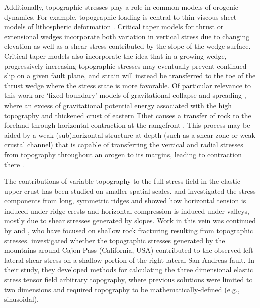 \documentclass[twocolumn,jgrga]{AGUTeX}
\begin{document}
\begin{article}
Additionally, topographic stresses play a role in common models of
orogenic dynamics. For example, topographic loading is central to thin
viscous sheet models of lithospheric deformation \citep[e.g.,][]{birdpiper80,
flesch2010gpe}. Critical taper models for thrust or extensional
wedges \citep[e.g.,][]{dahlen1990, xiao1991} incorporate both variation in
vertical stress due to changing elevation as well as a shear stress
contributed by the slope of the wedge surface. Critical taper models
also incorporate the idea that in a growing wedge, progressively
increasing topographic stresses may eventually prevent continued slip on
a given fault plane, and strain will instead be transferred to the toe
of the thrust wedge where the stress state is more favorable. Of
particular relevance to this work are `fixed boundary' models of
gravitational collapse and spreading \citep{rey2001}, where an excess of
gravitational potential energy associated with the high topography and
thickened crust of eastern Tibet causes a transfer of rock to the
foreland through horizontal contraction at the rangefront \citep[e.g.,][]
{dewey1988, liuyang2003, copleymckenzie2007}. This process may be
aided by a weak (sub)horizontal structure at depth (such as a shear zone
or weak crustal channel) that is capable of transferring the vertical
and radial stresses from topography throughout an orogen to its margins,
leading to contraction there \citep[e.g.,][]{clark2005, burchfiel2008,
fleschbendick2012}.

The contributions of variable topography to the full stress field in the
elastic upper crust has been studied on smaller spatial scales. 
\citet{mctiguemei1981} and
\citet{savageswolfs1986} investigated the stress components from long,
symmetric ridges and showed how horizontal tension is induced under
ridge crests and horizontal compression is induced under valleys, mostly
due to shear stresses generated by slopes. Work in this vein was
continued by \citet{millerdunne1996} and \citet{martel2006}, who have 
focused on shallow rock fracturing
resulting from topographic stresses. \citet{liuzoback1992} investigated 
whether the topographic stresses
generated by the mountains around Cajon Pass (California, USA)
contributed to the observed left-lateral shear stress on a shallow
portion of the right-lateral San Andreas fault. In their study, they
developed methods for calculating the three dimensional elastic stress
tensor field arbitrary topography, where previous solutions were limited
to two dimensions and required topography to be mathematically-defined
(e.g., sinusoidal).


\end{article}
\end{document}
